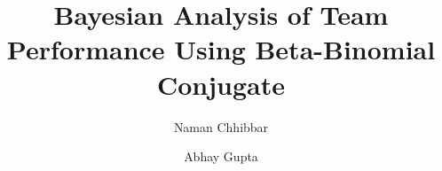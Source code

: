 \documentclass{beamer}
\title{Bayesian Analysis of Team Performance Using Beta-Binomial Conjugate}
\author[Naman Chhibbar \\ Abhay Gupta]{
  Naman Chhibbar \and
  Abhay Gupta
}
\institute{Indian Institute of Technology Hyderabad}
\begin{document}
  \begin{frame}
    \titlepage
  \end{frame}

  
  
  
  
  
  
  
  
\end{document}
